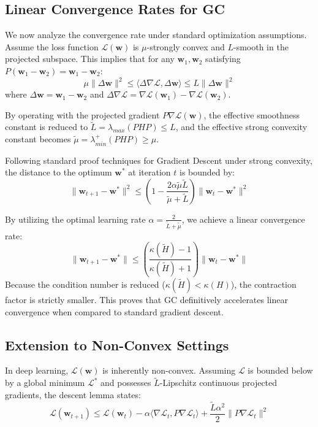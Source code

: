 \documentclass[conference]{IEEEtran}
\begin{document}
\subsection{Linear Convergence Rates for GC}
We now analyze the convergence rate under standard optimization assumptions. Assume the loss function $\mathcal{L}(\mathbf{w})$ is $\mu$-strongly convex and $L$-smooth in the projected subspace. This implies that for any $\mathbf{w}_1, \mathbf{w}_2$ satisfying $P(\mathbf{w}_1 - \mathbf{w}_2) = \mathbf{w}_1 - \mathbf{w}_2$:
\begin{equation}
\mu \| \Delta\mathbf{w} \|^2 \le \langle \Delta\nabla \mathcal{L}, \Delta\mathbf{w} \rangle \le L \| \Delta\mathbf{w} \|^2
\end{equation}
where $\Delta\mathbf{w} = \mathbf{w}_1 - \mathbf{w}_2$ and $\Delta\nabla \mathcal{L} = \nabla \mathcal{L}(\mathbf{w}_1) - \nabla \mathcal{L}(\mathbf{w}_2)$.

By operating with the projected gradient $P \nabla \mathcal{L}(\mathbf{w})$, the effective smoothness constant is reduced to $\tilde{L} = \lambda_{max}(PHP) \le L$, and the effective strong convexity constant becomes $\tilde{\mu} = \lambda_{min}^+(PHP) \ge \mu$.

Following standard proof techniques for Gradient Descent under strong convexity, the distance to the optimum $\mathbf{w}^*$ at iteration $t$ is bounded by:
\begin{equation}
\| \mathbf{w}_{t+1} - \mathbf{w}^* \|^2 \le \left( 1 - \frac{2\alpha \tilde{\mu} \tilde{L}}{\tilde{\mu} + \tilde{L}} \right) \| \mathbf{w}_t - \mathbf{w}^* \|^2
\end{equation}

By utilizing the optimal learning rate $\alpha = \frac{2}{\tilde{L} + \tilde{\mu}}$, we achieve a linear convergence rate:
\begin{equation}
\| \mathbf{w}_{t+1} - \mathbf{w}^* \| \le \left( \frac{\kappa(\tilde{H}) - 1}{\kappa(\tilde{H}) + 1} \right) \| \mathbf{w}_t - \mathbf{w}^* \|
\end{equation}
Because the condition number is reduced ($\kappa(\tilde{H}) < \kappa(H)$), the contraction factor is strictly smaller. This proves that GC definitively accelerates linear convergence when compared to standard gradient descent.

\subsection{Extension to Non-Convex Settings}
In deep learning, $\mathcal{L}(\mathbf{w})$ is inherently non-convex. Assuming $\mathcal{L}$ is bounded below by a global minimum $\mathcal{L}^*$ and possesses $\tilde{L}$-Lipschitz continuous projected gradients, the descent lemma states:
\begin{equation}
\mathcal{L}(\mathbf{w}_{t+1}) \le \mathcal{L}(\mathbf{w}_t) - \alpha \langle \nabla \mathcal{L}_t, P \nabla \mathcal{L}_t \rangle + \frac{\tilde{L}\alpha^2}{2} \| P \nabla \mathcal{L}_t \|^2
\end{equation}
\end{document}
